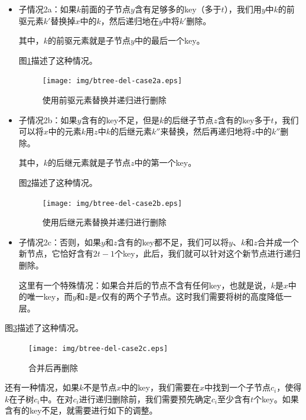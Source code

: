 \documentclass{ctexart}
\begin{document}
\begin{itemize}
\item 子情况2a：如果$k$前面的子节点$y$含有足够多的key（多于$t$），我们用$y$中$k$的前驱元素$k'$替换掉$x$中的$k$，然后递归地在$y$中将$k'$删除。

其中，$k$的前驱元素就是子节点$y$中的最后一个key。

图\ref{fig:btree-del-case2a}描述了这种情况。

\begin{figure}[htbp]
  \centering
    \texttt{[image: img/btree-del-case2a.eps]}
    \caption{使用前驱元素替换并递归进行删除} \label{fig:btree-del-case2a}
\end{figure}

\item 子情况2b：如果$y$含有的key不足，但是$k$的后继子节点$z$含有的key多于$t$，我们可以将$x$中的元素$k$用$z$中$k$的后继元素$k''$来替换，然后再递归地将$z$中的$k''$删除。

其中，$k$的后继元素就是子节点$z$中的第一个key。

图\ref{fig:btree-del-case2b}描述了这种情况。

\begin{figure}[htbp]
  \centering
    \texttt{[image: img/btree-del-case2b.eps]}
    \caption{使用后继元素替换并递归进行删除} \label{fig:btree-del-case2b}
\end{figure}

\item 子情况2c：否则，如果$y$和$z$含有的key都不足，我们可以将$y$、$k$和$z$合并成一个新节点，它恰好含有$2t-1$个key，此后，我们就可以针对这个新节点进行递归删除。

这里有一个特殊情况：如果合并后的节点不含有任何key，也就是说，$k$是$x$中的唯一key，而$y$和$z$是$x$仅有的两个子节点。这时我们需要将树的高度降低一层。
\end{itemize}

图\ref{fig:btree-del-case2c}描述了这种情况。

\begin{figure}[htbp]
  \centering
    \texttt{[image: img/btree-del-case2c.eps]}
    \caption{合并后再删除} \label{fig:btree-del-case2c}
\end{figure}

还有一种情况，如果$k$不是节点$x$中的key，我们需要在$x$中找到一个子节点$c_i$，使得$k$在子树$c_i$中。在对$c_i$进行递归删除前，我们需要预先确定$c_i$至少含有$t$个key。如果含有的key不足，就需要进行如下的调整。
\end{document}
